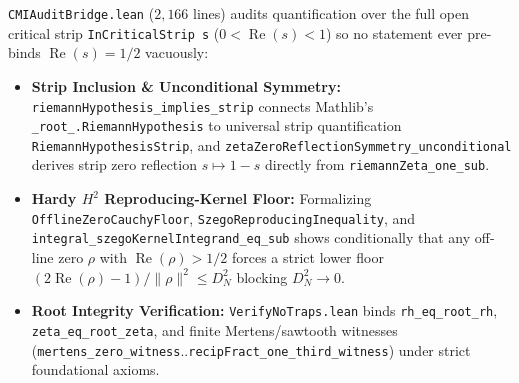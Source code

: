 \documentclass[11pt,a4paper]{article}
\theoremstyle{definition}
\begin{document}
\texttt{CMIAuditBridge.lean} ($2{,}166$ lines) audits quantification over the full open critical strip \texttt{InCriticalStrip s} ($0 < \operatorname{Re}(s) < 1$) so no statement ever pre-binds $\operatorname{Re}(s) = 1/2$ vacuously:
\begin{itemize}[noitemsep]
  \item \textbf{Strip Inclusion \& Unconditional Symmetry:} \texttt{riemannHypothesis\_\allowbreak implies\_\allowbreak strip} connects Mathlib's \texttt{\_root\_.\allowbreak RiemannHypothesis} to universal strip quantification \texttt{RiemannHypothesisStrip}, and \texttt{zetaZeroReflectionSymmetry\_\allowbreak unconditional} derives strip zero reflection $s \mapsto 1 - s$ directly from \texttt{riemannZeta\_\allowbreak one\_\allowbreak sub}.
  \item \textbf{Hardy $H^2$ Reproducing-Kernel Floor:} Formalizing \texttt{OfflineZeroCauchyFloor}, \texttt{SzegoReproducingInequality}, and \texttt{integral\_\allowbreak szegoKernelIntegrand\_\allowbreak eq\_\allowbreak sub} shows conditionally that any off-line zero $\rho$ with $\operatorname{Re}(\rho) > 1/2$ forces a strict lower floor $(2\operatorname{Re}(\rho) - 1)/\|\rho\|^2 \le D_N^2$ blocking $D_N^2 \to 0$.
  \item \textbf{Root Integrity Verification:} \texttt{VerifyNoTraps.lean} binds \texttt{rh\_\allowbreak eq\_\allowbreak root\_\allowbreak rh}, \texttt{zeta\_\allowbreak eq\_\allowbreak root\_\allowbreak zeta}, and finite Mertens/sawtooth witnesses (\texttt{mertens\_\allowbreak zero\_\allowbreak witness}..\texttt{recipFract\_\allowbreak one\_\allowbreak third\_\allowbreak witness}) under strict foundational axioms.
\end{itemize}
\end{document}
